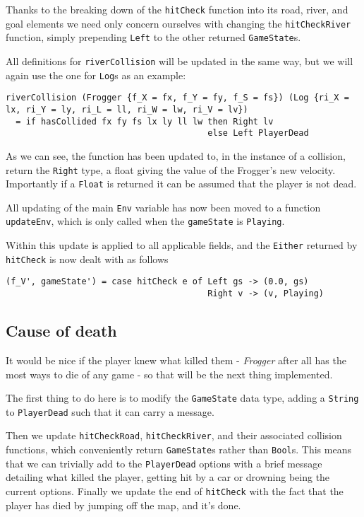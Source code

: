 \documentclass[12pt, a4paper]{report}
\begin{document}
Thanks to the breaking down of the \verb|hitCheck| function into its road, river, and goal elements we need only concern ourselves with changing the \verb|hitCheckRiver| function, simply prepending \verb|Left| to the other returned \verb|GameState|s.

All definitions for \verb|riverCollision| will be updated in the same way, but we will again use the one for \verb|Log|s as an example:

\begin{lstlisting}
riverCollision (Frogger {f_X = fx, f_Y = fy, f_S = fs}) (Log {ri_X = lx, ri_Y = ly, ri_L = ll, ri_W = lw, ri_V = lv})
  = if hasCollided fx fy fs lx ly ll lw then Right lv
                                        else Left PlayerDead

\end{lstlisting}

As we can see, the function has been updated to, in the instance of a collision, return the \verb|Right| type, a float giving the value of the Frogger's new velocity.
Importantly if a \verb|Float| is returned it can be assumed that the player is not dead.

\par

All updating of the main \verb|Env| variable has now been moved to a function \verb|updateEnv|, which is only called when the \verb|gameState| is \verb|Playing|.

Within this update is applied to all applicable fields, and the \verb|Either| returned by \verb|hitCheck| is now dealt with as follows

\begin{lstlisting}
(f_V', gameState') = case hitCheck e of Left gs -> (0.0, gs)
                                        Right v -> (v, Playing)
\end{lstlisting}

\subsection{Cause of death}

It would be nice if the player knew what killed them - \textit{Frogger} after all has the most ways to die of any game - so that will be the next thing implemented.

The first thing to do here is to modify the \verb|GameState| data type, adding a \verb|String| to \verb|PlayerDead| such that it can carry a message.

Then we update \verb|hitCheckRoad|, \verb|hitCheckRiver|, and their associated collision functions, which conveniently return \verb|GameState|s rather than \verb|Bool|s.
This means that we can trivially add to the \verb|PlayerDead| options with a brief message detailing what killed the player, getting hit by a car or drowning being the current options.
Finally we update the end of \verb|hitCheck| with the fact that the player has died by jumping off the map, and it's done.
\end{document}
